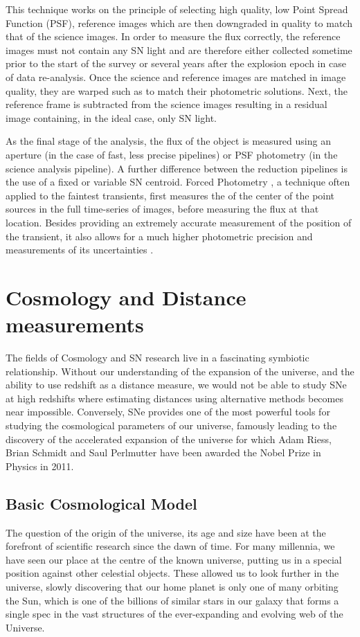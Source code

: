 This technique works on the principle of selecting high quality, low Point Spread Function (PSF), reference images which are then downgraded in quality to match that of the science images. In order to measure the flux correctly, the reference images must not contain any SN light and are therefore either collected sometime prior to the start of the survey or several years after the explosion epoch in case of data re-analysis. Once the science and reference images are matched in image quality, they are warped such as to match their photometric solutions. Next, the reference frame is subtracted from the science images resulting in a residual image containing, in the ideal case, only SN light.

As the final stage of the analysis, the flux of the object is measured using an aperture (in the case of fast, less precise pipelines) or PSF photometry (in the science analysis pipeline). A further difference between the reduction pipelines is the use of a fixed or variable SN centroid. Forced Photometry \citep{Bertin2011}, a technique often applied to the faintest transients, first measures the  of the center of the point sources in the full time-series of images, before measuring the flux at that location. Besides providing an extremely accurate measurement of the position of the transient, it also allows for a much higher photometric precision and  measurements of its uncertainties \citep{Firth2015}.

\section{Cosmology and Distance measurements}
The fields of Cosmology and SN research live in a fascinating symbiotic relationship. Without our understanding of the expansion of the universe, and the ability to use redshift as a distance measure, we would not be able to study SNe at high redshifts where estimating distances using alternative methods becomes near impossible. Conversely, SNe provides one of the most powerful tools for studying the cosmological parameters of our universe, famously leading to the discovery of the accelerated expansion of the universe \citep{Riess1998,Perlmutter1999} for which Adam Riess, Brian Schmidt and Saul Perlmutter have been awarded the Nobel Prize in Physics in 2011.

\subsection{Basic Cosmological Model}
The question of the origin of the universe, its age and size have been at the forefront of scientific research since the dawn of time. For many millennia, we have seen our place at the centre of the known universe, putting us in a special position against other celestial objects.  These allowed us to look further in the universe, slowly discovering that our home planet is only one of many orbiting the Sun, which is one of the billions of similar stars in our galaxy that forms a single spec in the vast structures of the ever-expanding and evolving web of the Universe.

